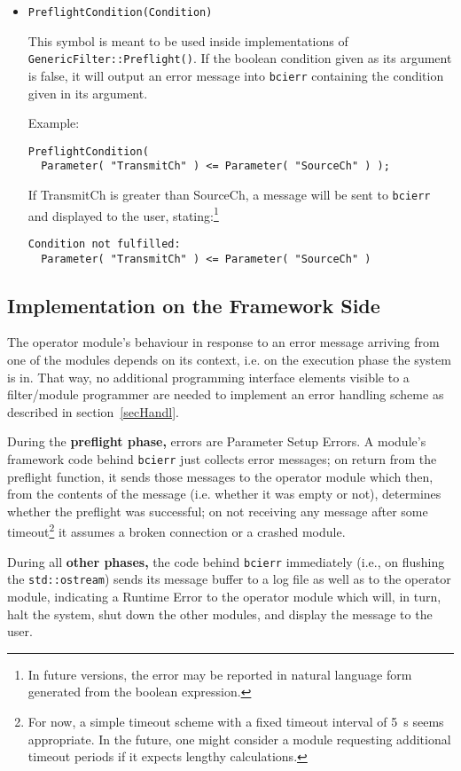 \documentclass[12pt,a4paper]{article}
\begin{document}
\begin{itemize}
\item \texttt{PreflightCondition(Condition)}

This symbol is meant to be used inside implementations of 
\texttt{GenericFilter::Preflight()}. If the boolean condition given as its
argument is false, it will output an error message into \texttt{bcierr} containing
the condition given in its argument.

Example:
\begin{verbatim}
PreflightCondition(
  Parameter( "TransmitCh" ) <= Parameter( "SourceCh" ) );
\end{verbatim}
If TransmitCh is greater than SourceCh, a message will be sent to \texttt{bcierr} and
displayed to the user, stating:\footnote{In future versions, the error may be reported
in natural language form generated from the boolean expression.}
\begin{verbatim}
Condition not fulfilled:
  Parameter( "TransmitCh" ) <= Parameter( "SourceCh" )
\end{verbatim}

\end{itemize}

\subsection{Implementation on the Framework Side}
\label{secImpl}

The operator module's behaviour in response to an error
message arriving from one of the modules depends
on its context, i.e. on the execution phase the system is in.
That way, no additional programming interface elements
visible to a filter/module programmer
are needed to implement an error handling scheme as
described in section~\ref{secHandl}. 

During the \textbf{preflight phase,} errors are {Parameter
Setup Errors.} A module's framework code behind
\texttt{bcierr} just collects error
messages; on return from the preflight function, it
sends those messages to the operator module which then,
from the contents of the message (i.e. whether it was empty
or not), determines whether the preflight was successful;
on not receiving any message after some timeout\footnote{
For now, a simple timeout scheme with a fixed timeout
interval of 5~s seems appropriate. In the future, one might consider
a module requesting additional timeout periods if it expects 
lengthy calculations.}
it assumes a broken connection or a crashed module.

During all \textbf{other phases,} the code behind \texttt{bcierr}
immediately (i.e., on flushing the \texttt{std::ostream})
sends its message buffer to a log file as well as to
the operator module, indicating a {Runtime Error} 
to the operator module which will, in turn, halt the system,
shut down the other modules, and display the message to the
user.
\end{document}
